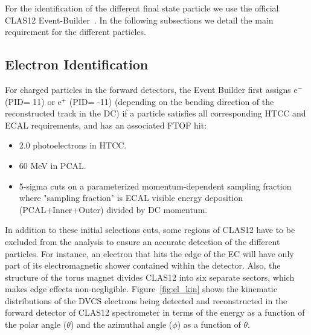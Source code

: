 For the identification of the different final state particle we use the 
official CLAS12 Event-Builder~\cite{eventbuilder}. In the following subsections 
we detail the main requirement for the different particles. 

\subsection{Electron Identification} 
For charged particles in the forward detectors, the Event Builder first assigns 
e$^-$ (PID= 11) or e$^+$ (PID= -11) (depending on the bending direction of the 
reconstructed track in the DC) if a particle satisfies all corresponding HTCC 
and ECAL requirements, and has an associated FTOF hit:
\begin{itemize}
 \item 2.0 photoelectrons in HTCC.
 \item 60 MeV in PCAL.
 \item  5-sigma cuts on a parameterized momentum-dependent sampling fraction 
    where "sampling fraction" is ECAL visible energy deposition 
      (PCAL+Inner+Outer) divided by DC momentum.  
      
\end{itemize}

In addition to these initial selections cuts, some regions of CLAS12 have to be 
excluded from the analysis to ensure an accurate detection of the different 
particles. For instance, an electron that hits the edge of the EC will have 
only part of its electromagnetic shower contained within the detector. Also, 
the structure of the torus magnet divides CLAS12 into six separate sectors, 
which makes edge effects non-negligible. Figure~\ref{fig:el_kin} shows the 
kinematic distributions of the DVCS electrons being detected and reconstructed 
in the forward detector of CLAS12 spectrometer in terms of the energy as a 
function of the polar angle ($\theta$) and the azimuthal angle ($\phi$) as a 
function of $\theta$. 

